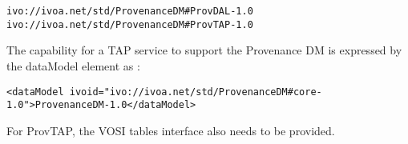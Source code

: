 \begin{verbatim}
ivo://ivoa.net/std/ProvenanceDM#ProvDAL-1.0
ivo://ivoa.net/std/ProvenanceDM#ProvTAP-1.0
\end{verbatim}

The capability for a TAP service to support the Provenance DM is expressed by the dataModel element as :
\begin{verbatim}
<dataModel ivoid="ivo://ivoa.net/std/ProvenanceDM#core-1.0">ProvenanceDM-1.0</dataModel>
\end{verbatim}

For ProvTAP, the VOSI tables interface also needs to be provided.

